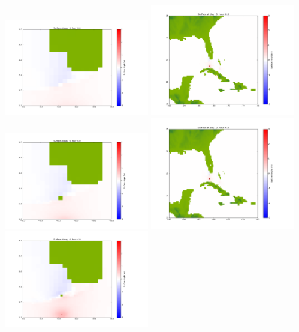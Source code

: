 \documentclass[11pt]{article}
\begin{document}
\vskip 10pt 
\includegraphics[width=0.475\textwidth]{frame0020fig1001.png}
\includegraphics[width=0.475\textwidth]{frame0020fig1002.png}
\vskip 10pt 
\includegraphics[width=0.475\textwidth]{frame0021fig1001.png}
\includegraphics[width=0.475\textwidth]{frame0021fig1002.png}
\vskip 10pt 
\includegraphics[width=0.475\textwidth]{frame0022fig1001.png}
\end{document}
